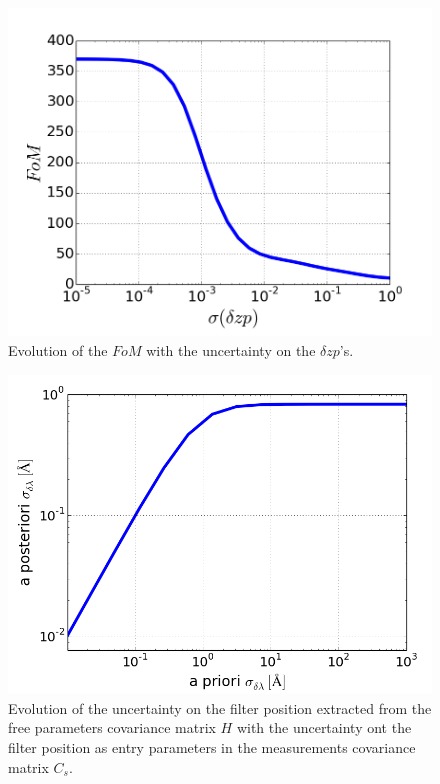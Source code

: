 \documentclass[\docopts]{\docclass}
\begin{document}
\begin{figure}[ht]
  \centering
  \includegraphics[width=\linewidth]{FoM_20k.png}
  \caption{Evolution of the $FoM$ with the uncertainty on the $\delta zp$'s.}
  \label{fig:fom_zp}
\end{figure}

\begin{figure}[ht]
  \centering
  \includegraphics[width=\linewidth]{a_posteriori_sigmas.png}
  \caption{Evolution of the uncertainty on the filter position extracted from the free parameters covariance matrix $H$ with the uncertainty ont the filter position as entry parameters in the measurements covariance matrix $C_s$.}
  \label{fig:delta_lambda_ev}
\end{figure}
\end{document}
